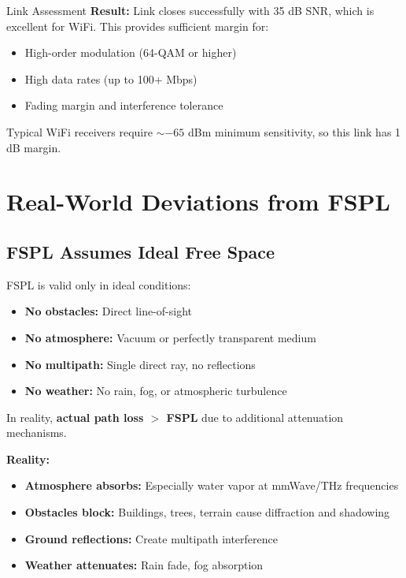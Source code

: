 \begin{calloutbox}{Link Assessment}
\textbf{Result:} Link closes successfully with 35 dB SNR, which is excellent for WiFi. This provides sufficient margin for:
\begin{itemize}
\item High-order modulation (64-QAM or higher)
\item High data rates (up to 100+ Mbps)
\item Fading margin and interference tolerance
\end{itemize}

Typical WiFi receivers require $\sim -65$ dBm minimum sensitivity, so this link has 1 dB margin.
\end{calloutbox}

\section{Real-World Deviations from FSPL}
\label{sec:deviations}

\subsection{FSPL Assumes Ideal Free Space}

\begin{warningbox}
FSPL is valid only in ideal conditions:
\begin{itemize}
\item \textbf{No obstacles:} Direct line-of-sight
\item \textbf{No atmosphere:} Vacuum or perfectly transparent medium
\item \textbf{No multipath:} Single direct ray, no reflections
\item \textbf{No weather:} No rain, fog, or atmospheric turbulence
\end{itemize}

In reality, \textbf{actual path loss $>$ FSPL} due to additional attenuation mechanisms.
\end{warningbox}

\textbf{Reality:}
\begin{itemize}
\item \textbf{Atmosphere absorbs:} Especially water vapor at mmWave/THz frequencies
\item \textbf{Obstacles block:} Buildings, trees, terrain cause diffraction and shadowing
\item \textbf{Ground reflections:} Create multipath interference
\item \textbf{Weather attenuates:} Rain fade, fog absorption
\end{itemize}


